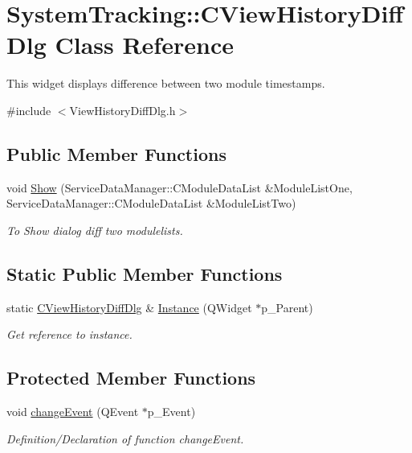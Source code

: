 \hypertarget{classSystemTracking_1_1CViewHistoryDiffDlg}{\section{\-System\-Tracking\-:\-:\-C\-View\-History\-Diff\-Dlg \-Class \-Reference}
\label{classSystemTracking_1_1CViewHistoryDiffDlg}
}


\-This widget displays difference between two module timestamps.  




{\ttfamily \#include $<$\-View\-History\-Diff\-Dlg.\-h$>$}

\subsection*{\-Public \-Member \-Functions}
\begin{DoxyCompactItemize}
\item 
void \hyperlink{classSystemTracking_1_1CViewHistoryDiffDlg_ac1445bb10d5e847b2c2fc5438aa64466}{\-Show} (\-Service\-Data\-Manager\-::\-C\-Module\-Data\-List \&\-Module\-List\-One, \-Service\-Data\-Manager\-::\-C\-Module\-Data\-List \&\-Module\-List\-Two)
\begin{DoxyCompactList}\small\item\em \-To \-Show dialog diff two modulelists. \end{DoxyCompactList}\end{DoxyCompactItemize}
\subsection*{\-Static \-Public \-Member \-Functions}
\begin{DoxyCompactItemize}
\item 
static \hyperlink{classSystemTracking_1_1CViewHistoryDiffDlg}{\-C\-View\-History\-Diff\-Dlg} \& \hyperlink{classSystemTracking_1_1CViewHistoryDiffDlg_acc92ac9420ce21a76a920aae06b82a94}{\-Instance} (\-Q\-Widget $\ast$p\-\_\-\-Parent)
\begin{DoxyCompactList}\small\item\em \-Get reference to instance. \end{DoxyCompactList}\end{DoxyCompactItemize}
\subsection*{\-Protected \-Member \-Functions}
\begin{DoxyCompactItemize}
\item 
void \hyperlink{classSystemTracking_1_1CViewHistoryDiffDlg_a2f66fdf9222d4c4407739f28c1b7ced2}{change\-Event} (\-Q\-Event $\ast$p\-\_\-\-Event)
\begin{DoxyCompactList}\small\item\em \-Definition/\-Declaration of function change\-Event. \end{DoxyCompactList}\end{DoxyCompactItemize}


